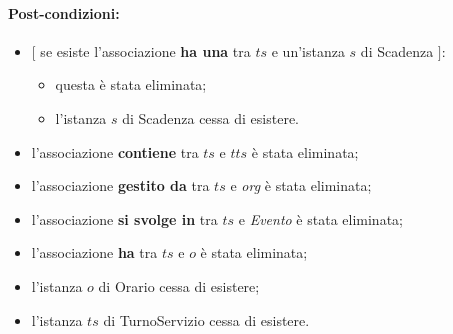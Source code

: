 \paragraph{Post-condizioni:} 
\begin{itemize}
    \item $[$ se esiste l'associazione \textbf{ha una} tra $ts$ e un'istanza $s$ di Scadenza $]$:
    \begin{itemize}
    \item questa è stata eliminata;
    \item l'istanza $s$ di Scadenza cessa di esistere.
    \end{itemize}
  \item l'associazione \textbf{contiene} tra $ts$ e $tts$ è stata eliminata;
 \item l'associazione \textbf{gestito da} tra $ts$ e \textit{org} è stata eliminata;
\item l'associazione \textbf{si svolge in} tra $ts$ e \textit{Evento} è stata eliminata;
 \item l'associazione \textbf{ha} tra $ts$ e $o$ è stata eliminata;
    \item l'istanza $o$ di Orario cessa di esistere;
    \item l'istanza $ts$ di TurnoServizio cessa di esistere.

 
\end{itemize}
